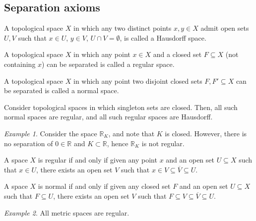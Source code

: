 \documentclass[11pt]{article}
\newcommand{\R}{\mathbb{R}}
\theoremstyle{definition}
\theoremstyle{remark}
\newtheorem*{example}{Example}
\numberwithin{equation}{section}
\begin{document}
    \subsection{Separation axioms}

    \begin{definition}
        A topological space $X$ in which any two distinct points $x, y \in X$ admit
        open sets $U, V$ such that $x \in U$, $y \in V$, $U \cap V = \emptyset$, is
        called a Hausdorff space.
    \end{definition}

    \begin{definition}
        A topological space $X$ in which any point $x \in X$ and a closed set
        $F\subseteq X$ (not containing $x$) can be separated is called a regular
        space.
    \end{definition}
    
    \begin{definition}
        A topological space $X$ in which any point two disjoint closed sets $F, F'
        \subseteq X$ can be separated is called a normal space.
    \end{definition}

    \begin{lemma}
        Consider topological spaces in which singleton sets are closed. Then, all
        such normal spaces are regular, and all such regular spaces are Hausdorff.
    \end{lemma}

    \begin{example}
        Consider the space $\R_K$, and note that $K$ is closed. However, there is no
        separation of $0 \in \R$ and $K \subset \R$, hence $\R_K$ is not regular.
    \end{example}

    \begin{lemma}
        A space $X$ is regular if and only if given any point $x$ and an open set $U
        \subseteq X$ such that $x \in U$, there exists an open set $V$ such that $x
        \in V \subseteq \overline{V} \subseteq U$.
    \end{lemma}
    \begin{lemma}
        A space $X$ is normal if and only if given any closed set $F$ and an open set
        $U \subseteq X$ such that $F \subseteq U$, there exists an open set $V$ such
        that $F \subseteq V \subseteq \overline{V} \subseteq U$.
    \end{lemma}
    \begin{example}
        All metric spaces are regular.
    \end{example}
\end{document}
